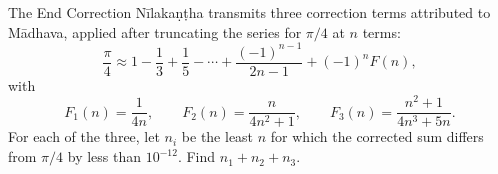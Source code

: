 \begin{problem}{The End Correction}
Nīlakaṇṭha transmits three correction terms attributed to Mādhava, applied after truncating the series for \(\pi/4\) at \(n\) terms:
    \[
    \frac{\pi}{4}\approx
    1-\frac13+\frac15-\cdots
    +\frac{(-1)^{n-1}}{2n-1}
    +(-1)^nF(n),
    \]
    with
    \[
    F_1(n)=\frac1{4n},\qquad
    F_2(n)=\frac{n}{4n^2+1},\qquad
    F_3(n)=\frac{n^2+1}{4n^3+5n}.
    \] 
For each of the three, let \(n_i\) be the least \(n\) for which the corrected sum differs from \(\pi/4\) by less than \(10^{-12}\). Find \(n_1+n_2+n_3\).
\end{problem}